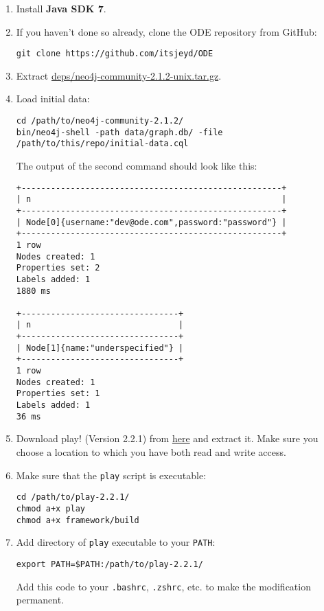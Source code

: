 \documentclass[11pt]{article}
\begin{document}
\begin{enumerate}
\item Install \textbf{Java SDK 7}.

\item If you haven't done so already, clone the ODE repository from
GitHub:

\begin{verbatim}
git clone https://github.com/itsjeyd/ODE
\end{verbatim}

\item Extract \url{deps/neo4j-community-2.1.2-unix.tar.gz}.

\item Load initial data:

\begin{verbatim}
cd /path/to/neo4j-community-2.1.2/
bin/neo4j-shell -path data/graph.db/ -file /path/to/this/repo/initial-data.cql
\end{verbatim}

The output of the second command should look like this:

\begin{verbatim}
+-----------------------------------------------------+
| n                                                   |
+-----------------------------------------------------+
| Node[0]{username:"dev@ode.com",password:"password"} |
+-----------------------------------------------------+
1 row
Nodes created: 1
Properties set: 2
Labels added: 1
1880 ms

+--------------------------------+
| n                              |
+--------------------------------+
| Node[1]{name:"underspecified"} |
+--------------------------------+
1 row
Nodes created: 1
Properties set: 1
Labels added: 1
36 ms
\end{verbatim}

\item Download play! (Version 2.2.1) from \href{http://downloads.typesafe.com/play/2.2.1/play-2.2.1.zip}{here} and extract it. Make
sure you choose a location to which you have both read and write
access.

\item Make sure that the \texttt{play} script is executable:

\begin{verbatim}
cd /path/to/play-2.2.1/
chmod a+x play
chmod a+x framework/build
\end{verbatim}

\item Add directory of \texttt{play} executable to your \texttt{PATH}:

\begin{verbatim}
export PATH=$PATH:/path/to/play-2.2.1/
\end{verbatim}

Add this code to your \texttt{.bashrc}, \texttt{.zshrc}, etc. to make the
modification permanent.
\end{enumerate}
\end{document}
